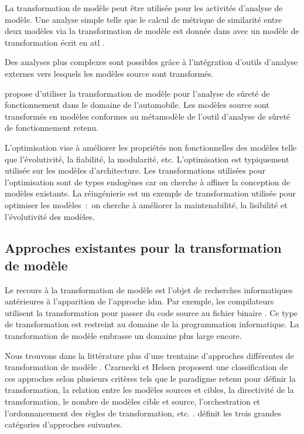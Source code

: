 La transformation de modèle peut être utilisée pour les activités d'analyse de 
modèle. Une analyse simple telle que le calcul de métrique de similarité entre 
deux modèles via la transformation de modèle est donnée dans \cite{del2007semi} 
avec un modèle de transformation écrit en \gls{atl} \cite{jouault2006transforming}. 

Des analyses plus complexes sont possibles grâce à l'intégration d'outils 
d'analyse externes vers lesquels les modèles source sont transformés.

\cite{biehl2010integrating} propose d'utiliser la transformation de modèle pour 
l'analyse de sûreté de fonctionnement dans le domaine de l'automobile. Les 
modèles source sont transformés en modèles conformes au métamodèle de l'outil 
d'analyse de sûreté de fonctionnement retenu.
 
L'optimisation vise à améliorer les propriétés non fonctionnelles des modèles 
telle que l'évolutivité, la fiabilité, la modularité, etc. L'optimisation est 
typiquement utilisée sur les modèles d'architecture. Les transformations 
utilisées pour l'optimisation sont de types endogènes car on cherche à affiner 
la conception de modèles existants. La réingénierie est un exemple de 
transformation utilisée pour optimiser les modèles~:~on cherche à améliorer la 
maintenabilité, la lisibilité et l'évolutivité des modèles.


\subsection{Approches existantes pour la transformation de modèle}  
Le recours à la transformation de modèle est l'objet de recherches informatiques 
antérieures à l'apparition de l'approche \gls{idm}. Par exemple, les compilateurs 
utilisent la transformation pour passer du code source au fichier binaire 
\cite{aho1985compilers}. Ce type de transformation est restreint au domaine de 
la programmation informatique. La transformation de modèle embrasse un domaine 
plus large encore.

Nous trouvons dans la littérature plus d'une trentaine d'approches différentes 
de transformation de modèle \cite{syriani2011multi}. Czarnecki et Helsen 
proposent une classification de ces approches selon plusieurs critères tels que 
le paradigme retenu pour définir la transformation, la relation entre les 
modèles sources et cibles, la directivité de la transformation, le nombre de 
modèles cible et source, l'orchestration et l'ordonnancement des règles de 
transformation, etc. \cite{czarnecki2006feature}. \cite{blanc2011mda} définit les trois grandes catégories d'approches suivantes.

